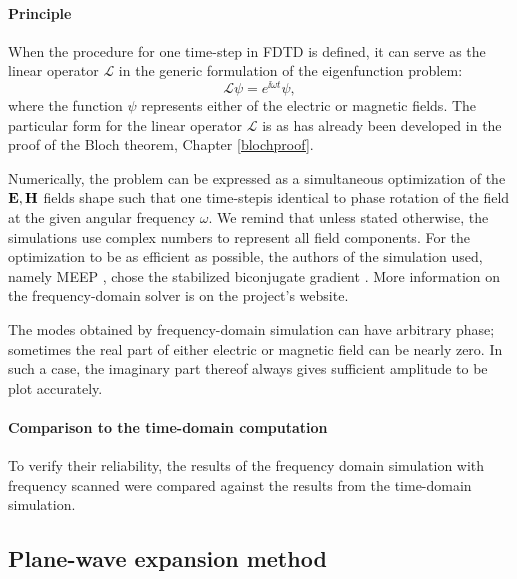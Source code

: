 \paragraph{Principle} 
When the procedure for one time-step in FDTD is defined, it can serve as the linear operator $\mathcal L$ in the generic formulation of the eigenfunction problem:
$$\mathcal{L} \psi = e^{\ii \omega t} \psi,$$
where the function $\psi$ represents either of the electric or magnetic fields. The particular form for the linear operator $\mathcal{L}$ is  
as has already been developed in the proof of the Bloch theorem, Chapter \ref{blochproof}.

Numerically, the problem can be expressed as a simultaneous optimization of the $\mathbf{E}, \mathbf{H}$ fields shape such that one time-stepis identical to phase rotation of the field at the given angular frequency $\omega$.
We remind that unless stated otherwise, the simulations use complex numbers to represent all field components.
For the optimization to be as efficient as possible, the authors of the simulation used, namely MEEP , chose the stabilized biconjugate gradient \cite{oskooi2010meep}. More information on the frequency-domain solver is on the project's website. %

The modes obtained by frequency-domain simulation can have arbitrary phase; sometimes the real part of either electric or magnetic field can be nearly zero. In such a case, the imaginary part thereof always gives sufficient amplitude to be plot accurately.


\paragraph{Comparison to the time-domain computation} 
To verify their reliability, the results of the frequency domain simulation with frequency scanned were compared against the results from the time-domain simulation.


\subsection{Plane-wave expansion method} %
